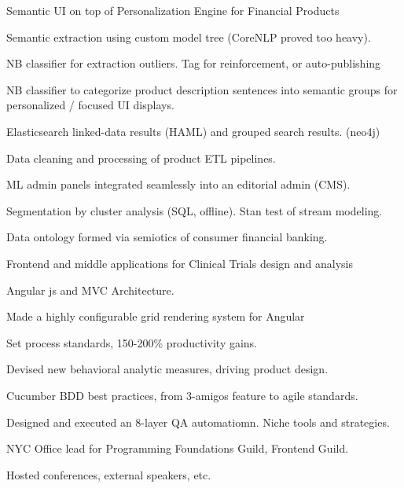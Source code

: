 \documentclass[letterpaper]{deedy-resume} %
\begin{document}
\begin{minipage}[t]{0.66\textwidth}
\sectionspace %



\vspace{\topsep} %
Semantic UI on top of Personalization Engine for Financial Products
\begin{tightitemize}
\item Semantic extraction using custom model tree (CoreNLP proved too heavy).
\item NB classifier for extraction outliers. Tag for reinforcement, or auto-publishing
\item NB classifier to categorize product description sentences into semantic groups for personalized / focused UI displays.
\item Elasticsearch linked-data results (HAML) and grouped search results. (neo4j)
\item Data cleaning and processing of product ETL pipelines.
\item ML admin panels integrated seamlessly into an editorial admin (CMS).
\item Segmentation by cluster analysis (SQL, offline).  Stan test of stream modeling.
\item Data ontology formed via semiotics of consumer financial banking.

\end{tightitemize}

\sectionspace %



Frontend and middle applications for Clinical Trials design and analysis
\vspace{\topsep} %
\begin{tightitemize}
\item Angular js and MVC Architecture.
\item Made a highly configurable grid rendering system for Angular
\item Set process standards, 150-200\% productivity gains. 
\item Devised new behavioral analytic measures, driving product design.
\item Cucumber BDD best practices, from 3-amigos feature to agile standards.
\item Designed and executed an 8-layer QA automatiomn. Niche tools and strategies.
\item NYC Office lead for Programming Foundations Guild, Frontend Guild. 
\item Hosted conferences, external speakers, etc. 
\end{tightitemize}


\end{minipage}
\end{document}
